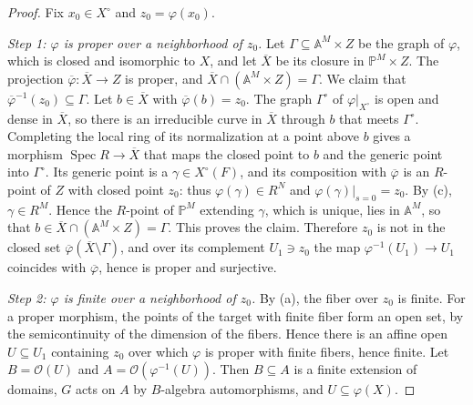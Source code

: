 \documentclass[11pt]{article}
\theoremstyle{definition}
\theoremstyle{remark}
\newcommand{\A}{\mathbb{A}}
\newcommand{\PP}{\mathbb{P}}
\newcommand{\cO}{\mathcal{O}}
\newcommand{\sm}{\setminus}
\DeclareMathOperator{\Spec}{Spec}
\begin{document}
\begin{proof}
Fix $x_0\in X^\circ$ and $z_0=\varphi(x_0)$.

\emph{Step 1: $\varphi$ is proper over a neighborhood of $z_0$.} Let $\Gamma\subseteq\A^M\times Z$ be the graph of $\varphi$, which is closed and isomorphic to $X$, and let $\overline X$ be its closure in $\PP^M\times Z$. The projection $\overline\varphi\colon\overline X\to Z$ is proper, and $\overline X\cap(\A^M\times Z)=\Gamma$. We claim that $\overline\varphi^{-1}(z_0)\subseteq\Gamma$. Let $b\in\overline X$ with $\overline\varphi(b)=z_0$. The graph $\Gamma^\circ$ of $\varphi|_{X^\circ}$ is open and dense in $\overline X$, so there is an irreducible curve in $\overline X$ through $b$ that meets $\Gamma^\circ$. Completing the local ring of its normalization at a point above $b$ gives a morphism $\Spec R\to\overline X$ that maps the closed point to $b$ and the generic point into $\Gamma^\circ$. Its generic point is a $\gamma\in X^\circ(F)$, and its composition with $\overline\varphi$ is an $R$-point of $Z$ with closed point $z_0$: thus $\varphi(\gamma)\in R^N$ and $\varphi(\gamma)|_{s=0}=z_0$. By (c), $\gamma\in R^M$. Hence the $R$-point of $\PP^M$ extending $\gamma$, which is unique, lies in $\A^M$, so that $b\in\overline X\cap(\A^M\times Z)=\Gamma$. This proves the claim. Therefore $z_0$ is not in the closed set $\overline\varphi(\overline X\sm\Gamma)$, and over its complement $U_1\ni z_0$ the map $\varphi^{-1}(U_1)\to U_1$ coincides with $\overline\varphi$, hence is proper and surjective.

\emph{Step 2: $\varphi$ is finite over a neighborhood of $z_0$.} By (a), the fiber over $z_0$ is finite. For a proper morphism, the points of the target with finite fiber form an open set, by the semicontinuity of the dimension of the fibers. Hence there is an affine open $U\subseteq U_1$ containing $z_0$ over which $\varphi$ is proper with finite fibers, hence finite. Let $B=\cO(U)$ and $A=\cO(\varphi^{-1}(U))$. Then $B\subseteq A$ is a finite extension of domains, $G$ acts on $A$ by $B$-algebra automorphisms, and $U\subseteq\varphi(X)$.


\end{proof}
\end{document}
